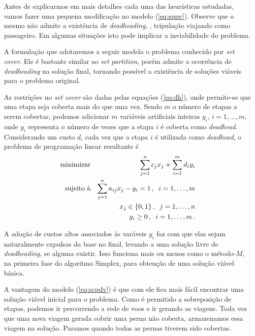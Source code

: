 Antes de explicarmos em mais detalhes cada uma das heurísticas estudadas, vamos fazer uma pequena
modificação no modelo (\ref{eq:sppv}). Observe que o mesmo não admite a existência de {\it
dead\-heading}, \ie, tripulação viajando como passageiro. Em algumas situações isto pode implicar a
inviabilidade do problema.

A formulação que adotaremos a seguir modela o problema conhecido por {\it set cover}. Ele é bastante
similar ao {\it set partition}, porém admite a ocorrência de {\it deadheading} na solução final,
tornando possível a existência de soluções viáveis para o problema original.

As restrições no {\it set cover} são dadas pelas equações (\ref{eq:dh}), onde permite-se que 
uma etapa seja coberta mais do que uma vez. Sendo $m$ o número de etapas a serem cobertas, podemos 
adicionar $m$ variáveis artificiais inteiras $y_i$, $i = 1, \ldots, m$, onde $y_i$ representa o 
número de vezes que a etapa $i$ é coberta como {\it deadhead}. Considerando um custo $d_i$ cada vez 
que a etapa $i$ é utilizada como {\it deadhead}, o problema de programação linear resultante é
%
\begin{eqnarray} \label{eq:scpdv}
	\text{minimizar} && \displaystyle \sum_{j=1}^n c_j x_j + \sum_{i=1}^m d_i y_i \nonumber \\
	\text{sujeito à} && \displaystyle \sum_{j=1}^n a_{ij} x_j - y_i = 1 \, , \;\; i = 1, \ldots, m \\
	                 && x_j \in \{0, 1\} \, , \;\; j = 1, \ldots, n \nonumber \\
	                 && y_i \geq 0 \, , \;\; i = 1, \ldots, m \, . \nonumber
\end{eqnarray}

A adoção de custos altos associados às varáveis $y_i$ faz com que elas sejam naturalmente expulsas 
da base no final, levando a uma solução livre de {\it deadheading}, se alguma existir. Isso funciona
mais ou menos como o método-$M$, na primeira fase do algoritmo Simplex, para obtenção de uma
solução viável básica.

A vantagem do modelo (\ref{eq:scpdv}) é que com ele fica mais fácil encontrar uma solução viável
inicial para o problema. Como é permitido a sobreposição de etapas, podemos ir percorrendo a rede
de voos e ir gerando as viagens. Toda vez que uma nova viagem gerada cobrir uma perna não coberta,
armazenamos essa viagem na solução. Paramos quando todas as pernas tiverem sido cobertas.


